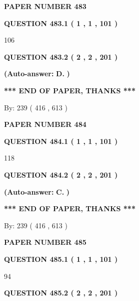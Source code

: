 \documentclass[12pt]{article}
\begin{document}
   
\newpage 
\setcounter{page}{ 
   483001 } 
   
   
 {\textbf{ \Large{ PAPER NUMBER  483  }}}
   
   
   
   
  
  
{\textbf{\large{QUESTION
483.1 
 ( 1 , 1 , 101 )
}}}

106
  
  
{\textbf{\large{QUESTION
483.2 
 ( 2 , 2 , 201 )
}}}
 
 
{\textbf{(Auto-answer:}}
{\textbf{\large{
D.}}}
{\textbf{)}}
 
 
   
   
   
   
\vspace{1.0in} 
{\textbf{\large{ *** END OF PAPER, THANKS *** }}} 
   
   
\hspace{1.0in} By: 
 239 ( 416 ,  613 )
   
   
   
   
\newpage 
\setcounter{page}{ 
   484001 } 
   
   
 {\textbf{ \Large{ PAPER NUMBER  484  }}}
   
   
   
   
  
  
{\textbf{\large{QUESTION
484.1 
 ( 1 , 1 , 101 )
}}}

118
  
  
{\textbf{\large{QUESTION
484.2 
 ( 2 , 2 , 201 )
}}}
 
 
{\textbf{(Auto-answer:}}
{\textbf{\large{
C.}}}
{\textbf{)}}
 
 
   
   
   
   
\vspace{1.0in} 
{\textbf{\large{ *** END OF PAPER, THANKS *** }}} 
   
   
\hspace{1.0in} By: 
 239 ( 416 ,  613 )
   
   
   
   
\newpage 
\setcounter{page}{ 
   485001 } 
   
   
 {\textbf{ \Large{ PAPER NUMBER  485  }}}
   
   
   
   
  
  
{\textbf{\large{QUESTION
485.1 
 ( 1 , 1 , 101 )
}}}

94
  
  
{\textbf{\large{QUESTION
485.2 
 ( 2 , 2 , 201 )
}}}
 
\end{document}
